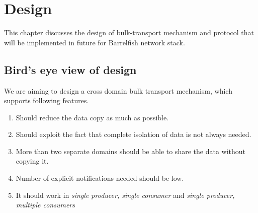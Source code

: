\documentclass[a4paper,twoside]{report} %
\begin{document}
\chapter{Design}
\label{chap:design}
This chapter discusses the design of bulk-transport mechanism and
protocol that will be implemented in future for Barrelfish network
stack.


\section{Bird's eye view of design}
We are aiming to design a cross domain bulk transport mechanism,
which supports following features.
\begin{enumerate}
  \item Should reduce the data copy as much as possible.
  \item Should exploit the fact that complete isolation of data
  is not always needed.
  \item More than two separate domains should be able to share
  the data without copying it.
  \item Number of explicit notifications needed should be low.
  \item It should work in \textit{single producer, single consumer}
  and \textit{single producer, multiple consumers}
\end{enumerate}
\end{document}
